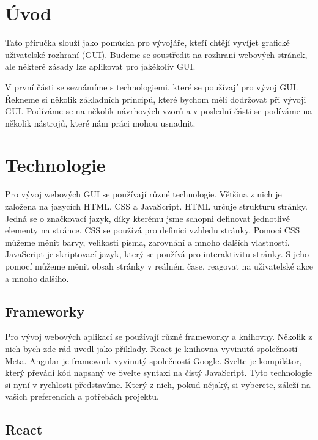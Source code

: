 \section{Úvod}
\label{chap:introduction}

Tato příručka slouží jako pomůcka pro vývojáře, kteří chtějí vyvíjet grafické uživatelské rozhraní (GUI). Budeme se soustředit na rozhraní webových stránek, ale některé zásady lze aplikovat pro jakékoliv GUI.

V první části se seznámíme s technologiemi, které se používají pro vývoj GUI. Řekneme si několik základních principů, které bychom měli dodržovat při vývoji GUI. Podíváme se na několik návrhových vzorů a v poslední části se podíváme na několik nástrojů, které nám práci mohou usnadnit.

\section{Technologie}
\label{sec:technologies}

Pro vývoj webových GUI se používají různé technologie. Většina z nich je založena na jazycích HTML, CSS a JavaScript. HTML určuje strukturu stránky. Jedná se o značkovací jazyk, díky kterému jsme schopni definovat jednotlivé elementy na stránce. CSS se používá pro definici vzhledu stránky. Pomocí CSS můžeme měnit barvy, velikosti písma, zarovnání a mnoho dalších vlastností. JavaScript je skriptovací jazyk, který se používá pro interaktivitu stránky. S jeho pomocí můžeme měnit obsah stránky v reálném čase, reagovat na uživatelské akce a mnoho dalšího.

\subsection{Frameworky}
\label{subsec:frameworks}

Pro vývoj webových aplikací se používají různé frameworky a knihovny. Několik z nich bych zde rád uvedl jako přiklady. React je knihovna vyvinutá společností Meta. Angular je framework vyvinutý společností Google. Svelte je kompilátor, který převádí kód napsaný ve Svelte syntaxi na čistý JavaScript. Tyto technologie si nyní v rychlosti představíme. Který z nich, pokud nějaký, si vyberete, záleží na vašich preferencích a potřebách projektu.

\subsection*{React}
\label{subsec:react}

